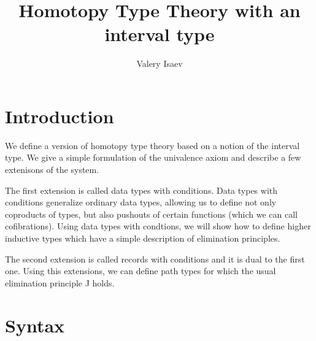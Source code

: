 \documentclass{amsart}
\theoremstyle{definition}
\theoremstyle{remark}
\numberwithin{figure}{section}
\begin{document}
\title{Homotopy Type Theory with an interval type}

\author{Valery Isaev}


\maketitle

\section{Introduction}

We define a version of homotopy type theory based on a notion of the interval type.
We give a simple formulation of the univalence axiom and describe a few extenisons of the system.

The first extension is called data types with conditions.
Data types with conditions generalize ordinary data types, allowing us to define not only coproducts of types, but also pushouts of certain functions (which we can call cofibrations).
Using data types with condtions, we will show how to define higher inductive types which have a simple description of elimination principles.

The second extension is called records with conditions and it is dual to the first one.
Using this extensions, we can define path types for which the usual elimination principle J holds.

\section{Syntax}

\centerAlignProof
\end{document}

